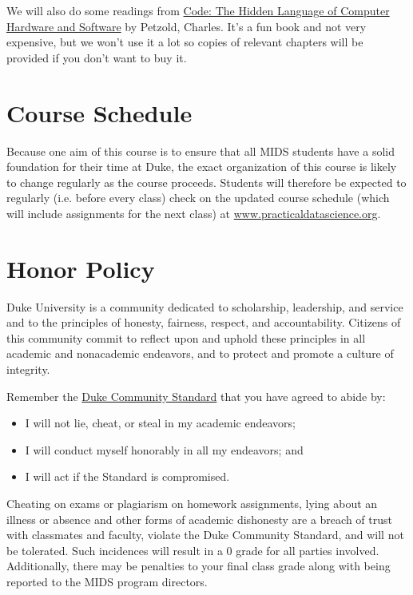\documentclass[12pt]{article}
\begin{document}
We will also do some readings from \href{https://www.amazon.com/Code-Language-Computer-Hardware-Software/dp/0735611319}{Code: The Hidden Language of Computer Hardware and Software} by Petzold, Charles. It's a fun book and not very expensive, but we won't use it a lot so copies of relevant chapters will be provided if you don't want to buy it.

\section{Course Schedule}

Because one aim of this course is to ensure that all MIDS students have a solid foundation for their time at Duke, the exact organization of this course is likely to change regularly as the course proceeds. Students will therefore be expected to regularly (i.e. before every class) check on the updated course schedule (which will include assignments for the next class) at \href{https://www.practicaldatascience.org}{www.practicaldatascience.org}.


\section{Honor Policy}

Duke University is a community dedicated to scholarship, leadership, and service and to the principles of honesty, fairness, respect, and accountability. Citizens of this community commit to reflect upon and uphold these principles in all academic and nonacademic endeavors, and to protect and promote a culture of integrity.

Remember the \href{https://studentaffairs.duke.edu/conduct/about-us/duke-community-standard}{Duke Community Standard} that you have agreed to abide by:

\begin{itemize}
	\item I will not lie, cheat, or steal in my academic endeavors;
	\item I will conduct myself honorably in all my endeavors; and
	\item I will act if the Standard is compromised.
\end{itemize}

Cheating on exams or plagiarism on homework assignments, lying about an illness or absence and other forms of academic dishonesty are a breach of trust with classmates and faculty, violate the Duke Community Standard, and will not be tolerated. Such incidences will result in a 0 grade for all parties involved. Additionally, there may be penalties to your final class grade along with being reported to the MIDS program directors.
\end{document}
